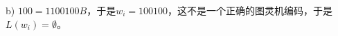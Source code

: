 \begin{solution}b)
    $100 = 1100100B$，于是$w_i=100100$，这不是一个正确的图灵机编码，于是$L(w_i)=\emptyset$。
\end{solution}